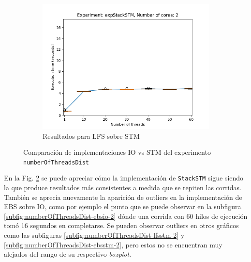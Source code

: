 \begin{figure}[H]
\begin{subfigure}[b]{0.49\textwidth}
    \end{subfigure}
    \begin{subfigure}[b]{0.49\textwidth}
        \includegraphics[width=\textwidth]{images/numberOfThreadsDist/plots/expStackSTM-2}
        \caption{Resultados para LFS sobre STM}
        \label{subfig:numberOfThreadsDist-stackstm-2}
    \end{subfigure}
    \caption{Comparación de implementaciones IO vs STM del experimento \texttt{numberOfThreadsDist}}
    \label{fig:numberOfThreadsDist-boxplots}
\end{figure}

En la Fig. \ref{fig:numberOfThreadsDist-boxplots} se puede apreciar cómo la implementación de \texttt{StackSTM} sigue siendo la que produce resultados más consistentes a medida que se repiten las corridas.
También se aprecia nuevamente la aparición de outliers en la implementación de EBS sobre IO, como por ejemplo el punto que se puede observar en la subfigura \ref{subfig:numberOfThreadsDist-ebsio-2} dónde una corrida con 60 hilos de ejecución tomó 16 segundos en completarse.
Se pueden observar outliers en otros gráficos como las subfiguras \ref{subfig:numberOfThreadsDist-lfsstm-2} y \ref{subfig:numberOfThreadsDist-ebsstm-2}, pero estos no se encuentran muy alejados del rango de su respectivo \emph{boxplot}.
